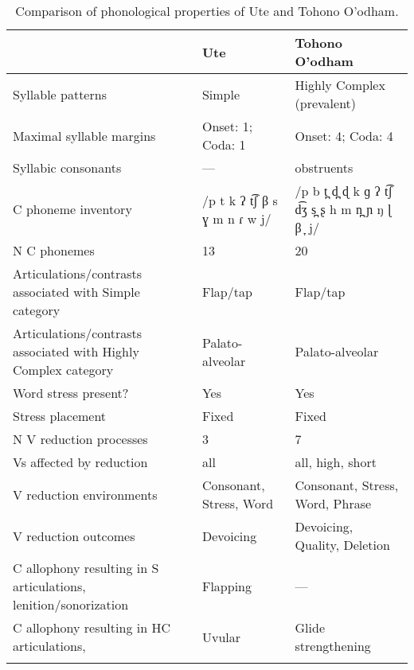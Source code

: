 \begin{table}
\small
\begin{tabularx}{\textwidth}{QQQ}
\lsptoprule
 & {Ute} & {Tohono O’odham}\\
 \midrule
 {Syllable patterns} & Simple & Highly Complex (prevalent)\\
 \tablevspace 
 {Maximal syllable margins} & Onset: 1; Coda: 1 & Onset: 4; Coda: 4\\
 \tablevspace 
 {Syllabic consonants} & — & obstruents\\
 \tablevspace 
 {C phoneme inventory} & /p t k ʔ t͡ʃ β s ɣ m n ɾ w j/ & /p b t̪ d̪ ɖ k ɡ ʔ t͡ʃ d͡ʒ s̪ ʂ h m n̪ ɲ ŋ ɭ β ̞ j/\\
 \tablevspace 
 {N C phonemes} & 13 & 20\\
 \tablevspace 
 {Articulations/contrasts associated with {Simple}} {category} & {Flap/tap} & {Flap/tap}\\
 \tablevspace 
 {Articulations/contrasts associated with {Highly Complex}} {category} & { {Palato-alveolar}} & { {Palato-alveolar}}\\
 \tablevspace 
 {Word stress present?} & {Yes} & {Yes}\\
 \tablevspace 
 {Stress placement} & {Fixed} & {Fixed}\\
 \tablevspace 
 {N V reduction processes} & {3} & {7}\\
 \tablevspace 
 {Vs affected by reduction}  & {all} & {all, high, short}\\
 \tablevspace 
 {V reduction environments} & {Consonant, Stress, Word} & {Consonant, Stress, Word, Phrase}\\
 \tablevspace 
 {V reduction outcomes} & {Devoicing} & {Devoicing, Quality, Deletion}\\
 \tablevspace 
 {C allophony resulting in S articulations, lenition/sonorization} & {{Flapping}} & {—}\\
\tablevspace 
 {{C allophony resulting in HC articulations,} } & {{Uvular}} & {Glide strengthening}\\
\lspbottomrule
\end{tabularx}
\caption{\label{tab:8.2}Comparison of phonological properties of Ute and Tohono O’odham.}
\end{table}

